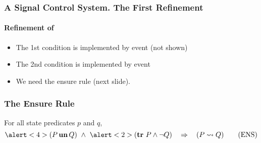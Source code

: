 \begin{frame}
  \frametitle{A Signal Control System. The First Refinement}
  \framesubtitle{Refinement of \depart}
  
  \begin{Reason}
  \end{Reason}

  \medskip

  \begin{itemize}
  \item The 1st condition is implemented by event \movein (not
    shown)
    \medskip

  \item The 2nd condition is implemented by event \moveout
    \medskip

  \item We need \alert{the ensure rule} (next slide).
  \end{itemize}

\end{frame}

\begin{frame}
  \frametitle{The Ensure Rule}
  
  \begin{Theorem} For all state predicates $p$ and $q$,
    \label{thm:ensure-rule}
    \begin{equation}
      \label{eq:ensure-rule}
      \alert<4>{(\predP \un \predQ)} \wide\land \alert<2>{(\tr \, \predP \land \neg \predQ)}
      \WIDE\limp (\predP \leadsto \predQ)
      \tag{ENS}
    \end{equation}
    
    \begin{center}
      
    \end{center}
  \end{Theorem}
\end{frame}

